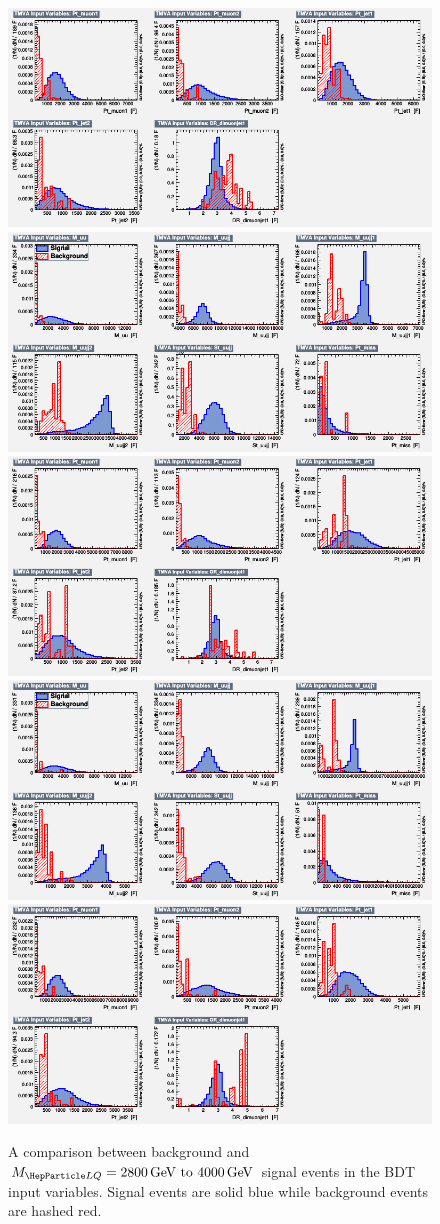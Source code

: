 \begin{figure}[H]
    {\includegraphics[width=.49\textwidth]{Images/Analysis/Results_LQToBMu_pair_uubj_BDTG_FullRun2_2023_01_25_020318/3000/variables_id_c2.png}}
    {\includegraphics[width=.49\textwidth]{Images/Analysis/Results_LQToBMu_pair_uubj_BDTG_FullRun2_2023_01_25_020318/3500/variables_id_c1.png}}
    {\includegraphics[width=.49\textwidth]{Images/Analysis/Results_LQToBMu_pair_uubj_BDTG_FullRun2_2023_01_25_020318/3500/variables_id_c2.png}}
    {\includegraphics[width=.49\textwidth]{Images/Analysis/Results_LQToBMu_pair_uubj_BDTG_FullRun2_2023_01_25_020318/4000/variables_id_c1.png}}
    {\includegraphics[width=.49\textwidth]{Images/Analysis/Results_LQToBMu_pair_uubj_BDTG_FullRun2_2023_01_25_020318/4000/variables_id_c2.png}}
    \caption{A comparison between background and $\MLQ = \SIrange{2800}{4000}{GeV}$ signal events in the BDT input variables. Signal events are solid blue while background events are hashed red.}
    \label{figapp:variables6}
\end{figure}

